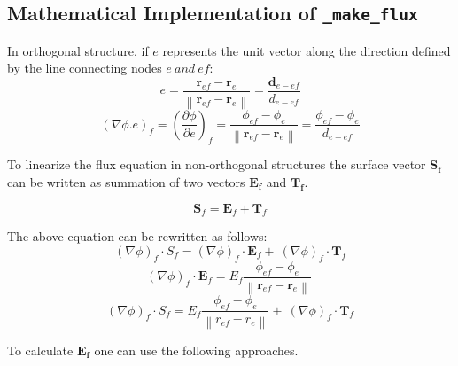 \documentclass[a4paper, 12pt]{article}
\begin{document}
\subsection{Mathematical Implementation of \texttt{\_make\_flux}}
In orthogonal structure, if \(e\) represents the unit vector along the
direction defined by the line connecting nodes \(e\ and\ ef\):
\begin{equation}
    e = \frac{\mathbf{r}_{ef} - \mathbf{r}_{e}}{\left\| \mathbf{r}_{ef} - \mathbf{r}_{e} \right\|} = \frac{\mathbf{d}_{e - ef}}{d_{e - ef}}
\end{equation}
\begin{equation}
    (\nabla\phi.e)_{f} = \left( \frac{\partial\phi}{\partial e} \right)_{f} = \frac{\phi_{ef} - \phi_{e}}{\left\| \mathbf{r}_{ef} - \mathbf{r}_{e} \right\|} = \frac{\phi_{ef} - \phi_{e}}{d_{e - ef}}
\end{equation} \par
To linearize the flux equation in non-orthogonal structures the surface
vector \(\mathbf{S_{f}}\) can be written as summation of two vectors \(\mathbf{E_{f}}\) and \(\mathbf{T_{f}}\). \par
\begin{equation}
    \mathbf{S}_{f} = \mathbf{E}_{f} + \mathbf{T}_{f}
\end{equation} \par
The above equation can be rewritten as follows:
\begin{equation}
    (\nabla\phi)_{f}\cdot S_{f} = (\nabla\phi)_{f}\cdot\mathbf{E}_{f} + \ (\nabla\phi)_{f} \cdot \mathbf{T}_{f}
\end{equation}
\begin{equation}(\nabla\phi)_{f}\cdot\mathbf{E}_{f} = E_{f}\frac{\phi_{ef} - \phi_{e}}{\left\| \mathbf{r}_{ef} - \mathbf{r}_{e} \right\|}\ 
\end{equation}
\begin{equation}
    (\nabla\phi)_{f}\cdot S_{f} = E_{f}\frac{\phi_{ef} - \phi_{e}}{\left\| r_{ef} - r_{e} \right\|} + \ (\nabla\phi)_{f}\cdot\mathbf{T}_{f}
\end{equation}\par
To calculate \(\mathbf{E_{f}}\) one can use the following approaches. \\\par
\end{document}
